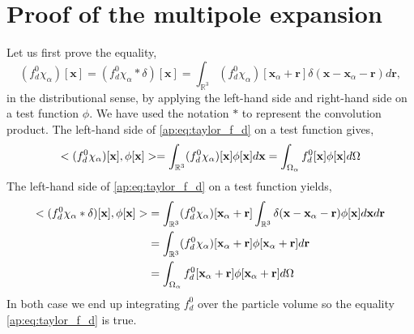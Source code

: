 \section{Proof of the multipole expansion}

Let us first prove the equality, 
\begin{equation}
    (f^0_d \chi_\alpha)[\textbf{x}]
    =
    (f^0_d \chi_\alpha * \delta)[\textbf{x}]
    =
    \int_{\mathbb{R}^3} 
     (f^0_d \chi_\alpha)[\textbf{x}_\alpha + \textbf{r}]\delta(\textbf{x} - \textbf{x}_\alpha - \textbf{r}) 
     d\textbf{r},
    \label{ap:eq:taylor_f_d}
\end{equation}
in the distributional sense, by applying the left-hand side and right-hand side on a test function $\phi$.
We have used the notation $*$ to represent the convolution product. 
The left-hand side of \ref{ap:eq:taylor_f_d} on a test function gives, 
\begin{equation}
    < (f^0_d \chi_\alpha)[\textbf{x}], \phi[\textbf{x}]>
    = \int_{\mathbb{R}^3}
    (f^0_d \chi_\alpha)[\textbf{x}] \phi[\textbf{x}]
    d\textbf{x}
    = \int_{\Omega_{\alpha}} 
        f^0_d [\textbf{x}] \phi[\textbf{x}]
         d\Omega
\end{equation}
The left-hand side of \ref{ap:eq:taylor_f_d} on a test function yields, 
\begin{align}
    <   (f^0_d \chi_\alpha *\delta)[\textbf{x}]
    , \phi[\textbf{x}]>
    &= 
    \int_{\mathbb{R}^3}
    (f^0_d \chi_\alpha)[\textbf{x}_\alpha + \textbf{r}]
    \int_{\mathbb{R}^3} 
     \delta(\textbf{x} - \textbf{x}_\alpha - \textbf{r}) 
     \phi[\textbf{x}]
     d\textbf{x}
     d\textbf{r}\\
    &= 
    \int_{\mathbb{R}^3}
    (f^0_d \chi_\alpha)[\textbf{x}_\alpha + \textbf{r}]
     \phi[\textbf{x}_\alpha + \textbf{r}]
     d\textbf{r}
    \\
    &=\intO{
        f^0_d [\textbf{x}_\alpha + \textbf{r}]
        \phi[\textbf{x}_\alpha + \textbf{r}]
    }
    \label{eq:second_equality}
\end{align}
In both case we end up integrating $f_d^0$ over the particle volume so the equality \ref{ap:eq:taylor_f_d} is true. 


